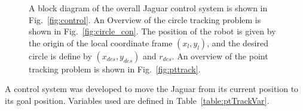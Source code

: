 \documentclass[conference]{../IEEEtran}
\begin{document}
\begin{figure}[t]
  \centering
  \caption{A block diagram of the overall Jaguar control system is shown in
           Fig.~\ref{fig:control}. An Overview of the circle tracking problem is
           shown in Fig.~\ref{fig:circle_con}.
           The position of the robot
           is given by the origin of the local coordinate frame $(x_l, y_l)$, and
           the desired circle is define by $(x_{des}, y_{des})$ and $r_{des}$. An overview of 
           the point tracking problem is shown in Fig.~\ref{fig:pttrack}.}
  \label{fig:controllers}
\end{figure}


A control system was developed to move the Jaguar from its current position to its goal
position. Variables used are defined in Table~\ref{table:ptTrackVar}.
\end{document}

